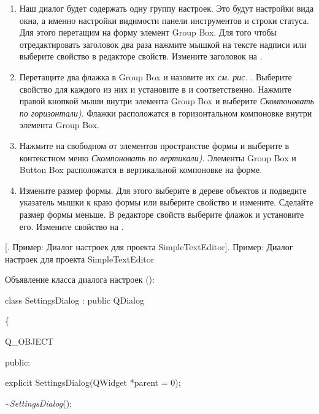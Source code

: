 \begin{enumerate}
\item Наш диалог будет содержать одну группу настроек. Это будут настройки вида окна, а именно настройки видимости
панели инструментов и строки статуса. Для этого перетащим на форму элемент Group Box. Для того чтобы отредактировать
заголовок два раза нажмите мышкой на тексте надписи или выберите свойство  в редакторе свойств.
Измените заголовок на .
\item Перетащите два флажка в Group Box и назовите их \Sys{(}\emph{см. рис.
}\Sys{\ref{ch15:refDrawing11}}\Sys{)}. Выберите свойство  для
каждого из них и установите в  и
 соответственно. Нажмите правой кнопкой мыши внутри элемента Group
Box и выберите \Sys{{>}}\emph{Скомпоновать по
горизонтали)}. Флажки расположатся в горизонтальном компоновке внутри элемента Group Box.
\item Нажмите на свободном от элементов пространстве формы и выберите в контекстном меню \Sys{{>}}\emph{Скомпоновать по вертикали)}. Элементы Group Box и Button Box расположатся в вертикальной компоновке на форме. 
\item Измените размер формы. Для этого выберите  в дереве объектов и подведите указатель
мышки к краю формы или выберите свойство  и измените. Сделайте размер формы меньше. В редакторе
свойств выберите флажок  и установите его. Измените свойство  на
. 
\end{enumerate}
{%
[. Пример: Диалог настроек для проекта SimpleTextEditor]{. Пример: Диалог настроек для проекта
SimpleTextEditor}
\label{ch15:refDrawing11}
\par}

Объявление класса диалога настроек ():

class SettingsDialog : public QDialog

\{

 Q\_OBJECT

public:

 explicit SettingsDialog(QWidget *parent = 0);

 \~{}\textit{SettingsDialog}();

